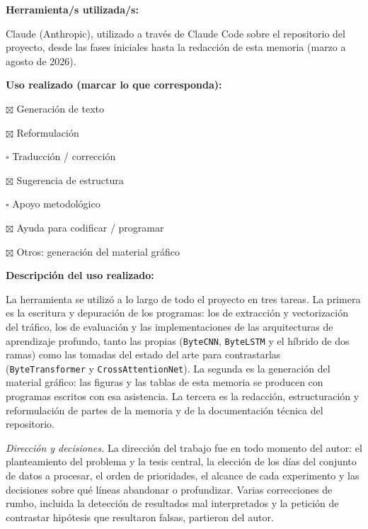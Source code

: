 %

\noindent\textbf{Herramienta/s utilizada/s:}

\vspace{0.5em}
Claude (Anthropic), utilizado a través de Claude Code sobre el repositorio del
proyecto, desde las fases iniciales hasta la redacción de esta memoria (marzo a
agosto de 2026).

\vspace{2em}
\noindent\textbf{Uso realizado (marcar lo que corresponda):}

$\boxtimes$ Generación de texto

$\boxtimes$ Reformulación

$\square$ Traducción / corrección

$\boxtimes$ Sugerencia de estructura

$\square$ Apoyo metodológico

$\boxtimes$ Ayuda para codificar / programar

$\boxtimes$ Otros: generación del material gráfico

\vspace{1em}
\noindent\textbf{Descripción del uso realizado:}

\vspace{0.5em}
\sloppy
La herramienta se utilizó a lo largo de todo el proyecto en tres tareas. La
primera es la escritura y depuración de los programas: los de extracción y
vectorización del tráfico, los de evaluación y las implementaciones de las
arquitecturas de aprendizaje profundo, tanto las propias (\texttt{ByteCNN},
\texttt{ByteLSTM} y el híbrido de dos ramas) como las tomadas del estado del
arte para contrastarlas (\texttt{ByteTransformer} y
\texttt{CrossAttentionNet}). La segunda es la generación del material gráfico:
las figuras y las tablas de esta memoria se producen con programas escritos con
esa asistencia. La tercera es la redacción, estructuración y reformulación de
partes de la memoria y de la documentación técnica del repositorio.

\vspace{0.5em}
\noindent\textit{Dirección y decisiones.} La dirección del trabajo fue en todo
momento del autor: el planteamiento del problema y la tesis central, la
elección de los días del conjunto de datos a procesar, el orden de prioridades,
el alcance de cada experimento y las decisiones sobre qué líneas abandonar o
profundizar. Varias correcciones de rumbo, incluida la detección de resultados
mal interpretados y la petición de contrastar hipótesis que resultaron falsas,
partieron del autor.

